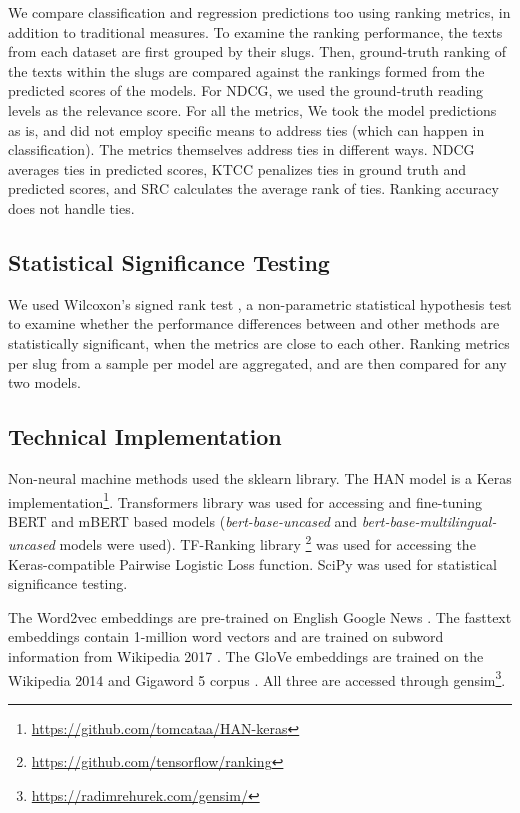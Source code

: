 \documentclass[11pt]{article}
\begin{document}
We compare classification and regression predictions too using ranking metrics, in addition to traditional measures. To examine the ranking performance, the texts from each dataset are first grouped by their slugs. Then, ground-truth ranking of the texts within the slugs are compared against the rankings formed from the predicted scores of the models. For NDCG, we used the ground-truth reading levels as the relevance score. For all the metrics, We took the model predictions as is, and did not employ specific means to address ties (which can happen in classification). The metrics themselves address ties in different ways. NDCG averages ties in predicted scores, KTCC penalizes ties in ground truth and predicted scores, and SRC calculates the average rank of ties. Ranking accuracy does not handle ties.  

\subsection{Statistical Significance Testing}
We used Wilcoxon's signed rank test \cite{wilcoxon}, a non-parametric statistical hypothesis test to examine whether the performance differences between  and other methods are statistically significant, when the metrics are close to each other. Ranking metrics per slug from a sample per model are aggregated, and are then compared for any two models. 

\subsection{Technical Implementation}
Non-neural machine methods used the sklearn \cite{Pedregosa.Varoquaux.ea-11} library. The HAN model is a Keras implementation\footnote{\url{https://github.com/tomcataa/HAN-keras}}. Transformers library \cite{Wolf.Debut.ea-20} was used for accessing and fine-tuning BERT and mBERT based models (\textit{bert-base-uncased} and \textit{bert-base-multilingual-uncased} models were used).  TF-Ranking library \footnote{\url{https://github.com/tensorflow/ranking}} \cite{Pasumarthi.Bruch.ea-19} was used for accessing the Keras-compatible Pairwise Logistic Loss function. SciPy\cite{Virtanen.Gommers.ea-20} was used for statistical significance testing. 

The Word2vec embeddings are pre-trained on English Google News \cite{Mikolov.Chen.ea-13}. The fasttext embeddings contain 1-million word vectors and are trained on subword information from Wikipedia 2017 \cite{Bojanoswki.Grave.ea-17}. The GloVe embeddings are trained on the Wikipedia 2014 and Gigaword 5 corpus \cite{Pennington.Socher.ea-14}. All three are accessed through gensim\footnote{\url{https://radimrehurek.com/gensim/}}.  
\end{document}

